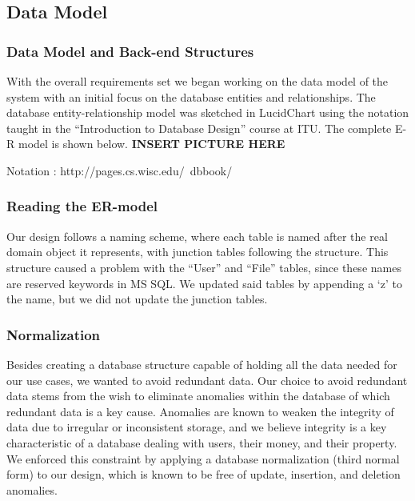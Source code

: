 \subsection{Data Model}
\subsubsection{Data Model and Back-end Structures}
\label{sec:datamodel}

With the overall requirements set we began working on the data model of the system with an initial focus on the database entities and relationships. The database entity-relationship model was sketched in LucidChart using the notation taught in the “Introduction to Database Design” course at ITU. The complete E-R  model is shown below.
\textbf{INSERT PICTURE HERE}

Notation : http://pages.cs.wisc.edu/~dbbook/

\subsubsection{Reading the ER-model}
\label{sec:readingdatamodel}
Our design follows a naming scheme, where each table is named after the real domain object it represents, with junction tables following the structure.
This structure caused a problem with the “User” and “File” tables, since these names are reserved keywords in MS SQL. We updated said tables by appending a ‘z’ to the name, but we did not update the junction tables.

\subsubsection{Normalization}
\label{sec:normalization}
Besides creating a database structure capable of holding all the data needed for our use cases, we wanted to avoid redundant data. Our choice to avoid redundant data stems from the wish to eliminate anomalies within the database of which redundant data is a key cause. Anomalies are known to weaken the integrity of data due to irregular or inconsistent storage, and we believe integrity is a key characteristic of a database dealing with users, their money, and their property. We enforced this constraint by applying a database normalization (third normal form) to our design, which is known to be free of update, insertion, and deletion anomalies.

